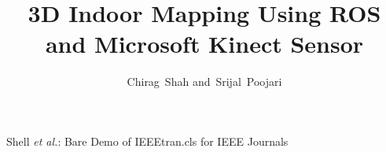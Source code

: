 \documentclass[journal]{IEEEtran}
\begin{document}
\title{3D Indoor Mapping Using ROS and Microsoft Kinect Sensor}
\author{Chirag~Shah
        and~Srijal~Poojari}%

% 
%


%
{Shell \MakeLowercase{\textit{et al.}}: Bare Demo of IEEEtran.cls for IEEE Journals}
% 




\end{document}
